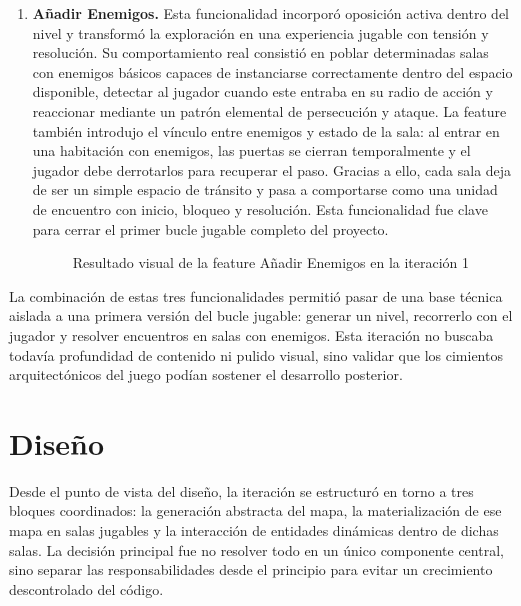 \begin{enumerate}
\begin{figure}[H]
\begin{center}
\caption{Resultado visual de la feature Añadir Jugador en la iteración 1}
\label{fig:iteracion1-feature-jugador}
\end{center}
\end{figure}

\item \textbf{Añadir Enemigos.} Esta funcionalidad incorporó oposición activa dentro del
nivel y transformó la exploración en una experiencia jugable con tensión y resolución. Su
comportamiento real consistió en poblar determinadas salas con enemigos básicos capaces de
instanciarse correctamente dentro del espacio disponible, detectar al jugador cuando este
entraba en su radio de acción y reaccionar mediante un patrón elemental de persecución y
ataque. La feature también introdujo el vínculo entre enemigos y estado de la sala: al
entrar en una habitación con enemigos, las puertas se cierran temporalmente y el jugador
debe derrotarlos para recuperar el paso. Gracias a ello, cada sala deja de ser un simple
espacio de tránsito y pasa a comportarse como una unidad de encuentro con inicio, bloqueo y
resolución. Esta funcionalidad fue clave para cerrar el primer bucle jugable completo del
proyecto.

\begin{figure}[H]
\begin{center}
\caption{Resultado visual de la feature Añadir Enemigos en la iteración 1}
\label{fig:iteracion1-feature-enemigos}
\end{center}
\end{figure}
\end{enumerate}

La combinación de estas tres funcionalidades permitió pasar de una base técnica aislada a
una primera versión del bucle jugable: generar un nivel, recorrerlo con el jugador y
resolver encuentros en salas con enemigos. Esta iteración no buscaba todavía profundidad
de contenido ni pulido visual, sino validar que los cimientos arquitectónicos del juego
podían sostener el desarrollo posterior.

\section{Diseño}
Desde el punto de vista del diseño, la iteración se estructuró en torno a tres bloques
coordinados: la generación abstracta del mapa, la materialización de ese mapa en salas
jugables y la interacción de entidades dinámicas dentro de dichas salas. La decisión
principal fue no resolver todo en un único componente central, sino separar las
responsabilidades desde el principio para evitar un crecimiento descontrolado del código.

